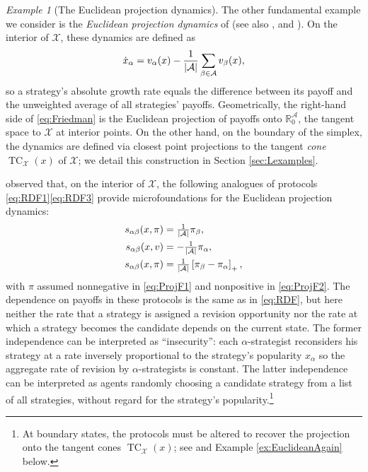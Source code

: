 \documentclass[reqno]{amsart}
\DeclarePairedDelimiter{\abs}{\lvert}{\rvert}
\theoremstyle{plain}
\theoremstyle{definition}
\theoremstyle{remark}
\newtheorem{example}[theorem]{Example}
\numberwithin{equation}{section}
\numberwithin{theorem}{section}
\begin{document}
\begin{example}
[The  Euclidean projection dynamics]
\label{ex:proj}
The other fundamental example we consider is the \emph{Euclidean projection dynamics} of \cite{NZ97} (see also \citealp{Fri91}, and \citealp{LS08}).
On the interior of ${\mathcal{X}}$, these dynamics are defined as
\begin{equation}
\label{eq:Friedman}
\dot x_{\alpha}
	= {v}_{\alpha}(x) -\frac{1}{\abs{\mathcal{A}}} \sum_{\beta\in{\mathcal{A}}} {v}_{\beta}(x),
\end{equation}
so a strategy's absolute growth rate equals the difference between its payoff and the unweighted average of all strategies' payoffs.  Geometrically, the right-hand side of \eqref{eq:Friedman} is the Euclidean projection of payoffs onto ${\mathbb{R}}_{0}^{\mathcal{A}}$, the tangent space to ${\mathcal{X}}$ at interior points.
On the other hand, on the boundary of the simplex, the dynamics are defined via closest point projections to the tangent \emph{cone} $\operatorname{TC}_{\mathcal{X}}(x)$ of ${\mathcal{X}}$;
we detail this construction in Section \ref{sec:Lexamples}.

\cite{SDL08} observed that, on the interior of ${\mathcal{X}}$, the following analogues of protocols \eqref{eq:RDF1}\textendash\eqref{eq:RDF3} provide microfoundations for the Euclidean projection dynamics:
\begin{subequations}
\label{eq:ProjF}
\begin{flalign}
\label{eq:ProjF1}
{s}_{\alpha\beta}(x,\pi)
	&= \tfrac{1}{\abs{\mathcal{A}}}\pi_{\beta},
	\\
\label{eq:ProjF2}
{s}_{\alpha\beta}(x,{v})
	&= -\tfrac{1}{\abs{\mathcal{A}}}\pi_{\alpha},
	\\
\label{eq:ProjF3}
{s}_{\alpha\beta}(x,\pi)
	&= \tfrac{1}{\abs{\mathcal{A}}}\left[ \pi_{\beta} -\pi_{\alpha} \right]_{+},
\end{flalign}
\end{subequations}
with $\pi$ assumed nonnegative in \eqref{eq:ProjF1} and nonpositive in \eqref{eq:ProjF2}.
The dependence on payoffs in these protocols is the same as in \eqref{eq:RDF}, but here neither the rate that a strategy is assigned a revision opportunity nor the rate at which a strategy becomes the candidate depends on the current state.
The former independence can be interpreted as ``insecurity'':
each $\alpha$-strategist reconsiders his strategy at a rate inversely proportional to the strategy's popularity $x_{\alpha}$ so the aggregate rate of revision by $\alpha$-strategists is constant.
The latter independence can be interpreted as agents randomly choosing a candidate strategy from a list of all strategies, without regard for the strategy's popularity.\footnote{At boundary states, the protocols must be altered to recover the projection onto the tangent cones $\operatorname{TC}_{\mathcal{X}}(x)$;
see \cite{SDL08} and Example \ref{ex:EuclideanAgain} below.}
\end{example}
\end{document}

